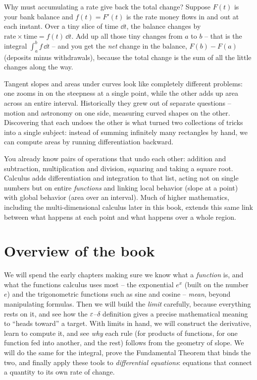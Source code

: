 \begin{whybox}
Why must accumulating a rate give back the total change? Suppose $F(t)$ is your bank balance and $f(t) = F'(t)$
is the rate money flows in and out at each instant. Over a tiny slice of time
$\dd t$, the balance changes by $\text{rate}\times\text{time} = f(t)\,\dd t$. Add up all
those tiny changes from $a$ to $b$ -- that is the integral $\int_a^b f\,\dd t$ --
and you get the \emph{net} change in the balance, $F(b)-F(a)$ (deposits minus
withdrawals), because the total change is the sum of all the little changes along the way.
\end{whybox}

\begin{aestheticbox}
Tangent slopes and areas under curves look like completely different problems: one zooms in on the steepness at a single point, while the other adds up area across an entire interval. Historically they grew out of separate questions -- motion and astronomy on one side, measuring curved shapes on the other. Discovering that each undoes the other is what turned two collections of tricks into a single subject: instead of summing infinitely many rectangles by hand, we can compute areas by running differentiation backward.
\end{aestheticbox}

\begin{connectionbox}
You already know pairs of operations that undo each other: addition and
subtraction, multiplication and division, squaring and taking a square root.
Calculus adds differentiation and integration to that list, acting not on
single numbers but on entire \emph{functions} and linking local behavior (slope at a
point) with global behavior (area over an interval). Much of higher mathematics,
including the multi-dimensional calculus later in this book, extends this
same link between what happens at each point and what happens over a whole region.
\end{connectionbox}

\section{Overview of the book}

We will spend the early chapters making sure we know
what a \emph{function} is, and what the functions calculus uses most -- the
exponential $e^x$ (built on the number $e$) and the trigonometric functions such as sine and cosine --
\emph{mean}, beyond manipulating formulas. Then we will build the
\emph{limit} carefully, because everything rests on it, and see how the
$\varepsilon$--$\delta$ definition gives a precise mathematical meaning to ``heads toward'' a target. With limits in hand, we will construct the
derivative, learn to compute it, and see \emph{why} each rule (for products of
functions, for one function fed into another, and the rest) follows from the geometry of
slope. We will do the same for the integral, prove the Fundamental Theorem that
binds the two, and finally apply these tools to \emph{differential equations}:
equations that connect a quantity to its own rate of change.

